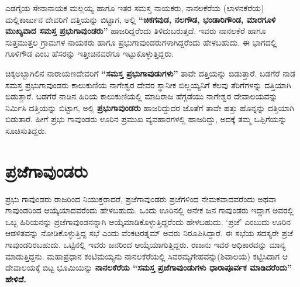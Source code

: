 ಎಡಗೈಯ ಸೇನಾನಾಯಕ ಮಲ್ಲಯ್ಯ ಹಾಗೂ ಇತರ ಸಮಸ್ತ ನಾಯಕರು, ನಾನಲಕೆರೆಯ (ಲಾಳನಕೆರೆಯ) ಮಲ್ಲಿಕಾರ್ಜುನ ದೇವರಿಗೆ ದತ್ತಿಯನ್ನು ಬಿಟ್ಟಾಗ, ಅಲ್ಲಿ \textbf{“ಚಿಕಗವುಡ, ನಲಗೌಡ, ಭಂಡಾರಿಗೌಂಡ, ಮಾರಗೂಳಿ ಮುಖ್ಯವಾದ ಸಮಸ್ತ ಪ್ರಭುಗಾವುಂಡರು”} ಹಾಜರಿದ್ದರೆಂದು ತಿಳಿದುಬರುತ್ತದೆ. ಇವರು ನಾನಲಕೆರೆ ಹಾಗೂ ಸುತ್ತಮುತ್ತಲ ಗ್ರಾಮಗಳ ನಾಯಕರು ಹಾಗೂ ಪ್ರಭುಗಾವುಂಡರುಗಳಾಗಿದ್ದರೆಂದು ಹೇಳಬಹುದು. ಈ ಭಾಗದಲ್ಲಿ ಗೂಳಿಗೌಡ ಎಂಬ ಹೆಸರನ್ನು ಇತ್ತೀಚಿನವರೆಗೂ ಇಟ್ಟುಕೊಳ್ಳುತ್ತಿದ್ದರು.

ಚಿಕ್ಕಅಬ್ಬಾಗಿಲಿನ ನಾರಾಯಣದೇವರಿಗೆ \textbf{“ಸಮಸ್ತ ಪ್ರಭುಗಾವುಡುಗಳು”} ತಾವೇ ದತ್ತಿಯನ್ನು ಬಿಡುತ್ತಾರೆ. ಬಡಗೆರೆ ನಾಡ ಸಮಸ್ತ ಪ್ರಭುಗಾವುಂಡರು ಕಾಲುಕುಣಿಯ ನಾಗೇಶ್ವರ ದೇವರ ಸ್ಥಾನೀಕ ಬಿಲ್ಲಯ್ಯನಿಗೆ ಕೆಲವು ತೆರಿಗೆಗಳನ್ನು ದತ್ತಿಯಾಗಿ ಬಿಡುತ್ತಾರೆ. ಬಡಗೆರೆ ನಾಡಿನ ಹಿರಿಯ ಕಾಲುಕುಣಿಯಲ್ಲಿ ಮಾದಿರಾಜ ಹೆಗ್ಗಡೆಯು ನಾಗೇಶ್ವರ ದೇವಾಲಯವನ್ನು ನಿರ್ಮಿಸಿ ದತ್ತಿಯನ್ನು ಬಿಟ್ಟಾಗ, ಅಲ್ಲಿ \textbf{ಪ್ರಭುಗಾವುಂಡರು} ಹಾಜರಿದ್ದುದರ ಜೊತೆಗೆ ತಾವೇ ಹತ್ತು ಹೊನ್ನನ್ನು ದತ್ತಿಯಾಗಿ ಬಿಡುತಾರೆ. ಹೀಗೆ ಪ್ರಭು ಗಾವುಂಡರು ಊರಿನ ಪ್ರಮುಖ ವ್ಯವಹಾರಗಳಲ್ಲಿ ಹಾಜರಿದ್ದು, ಅದಕ್ಕೆ ತಮ್ಮ ಒಪ್ಪಿಗೆಯನ್ನು ಸೂಚಿಸುತಿದ್ದರು.


\section*{ಪ್ರಜೆಗಾವುಂಡರು}

ಪ್ರಭು ಗಾವುಂಡರು ರಾಜರಿಂದ ನಿಯುಕ್ತರಾದರೆ, ಪ್ರಜೆಗಾವುಂಡರು ಪ್ರಜೆಗಳಿಂದ ನೇಮಕವಾದವರೆಂದು ಅಥವಾ ಗಾವುಂಡ\-ರಿಂದ ಆಯ್ಕೆಯಾದವರೆಂದು ಹೇಳಬಹುದು. ಒಂದು ಊರಿನಲ್ಲಿ ಅನೇಕ ಜನ ಗಾವುಂಡರು ಇದ್ದಾಗ ಅವರಲ್ಲಿ ಒಬ್ಬ ಹಿರಿಯನನ್ನು ಪ್ರಜೆಗಾವುಂಡನನ್ನಾಗಿ ಆಯ್ಕೆಮಾಡಿಕೊಳ್ಳುತ್ತಿದ್ದರೆಂದು ಹೇಳಬಹುದು. ‘ಪ್ರಜೆ’ ಎಂಬುದು ಊರಿನ ಆಡಳಿತವನ್ನು ನೋಡಿ\-ಕೊಳ್ಳುತ್ತಿದ್ದ ಸಭೆ ಎಂದು ವೆಂಕಟರತ್ನಮ್ ಅವರು ನಿರೂಪಿಸಿದ್ದಾರೆ. ಈ ಸಭೆಯ ಸದಸ್ಯರೇ ಪ್ರಜೆ ಗಾವುಂಡರಿರಬಹುದು. ಒಟ್ಟಿನಲ್ಲಿ ಇವರು ಜನರಿಂದ ಆಯ್ಕೆಯಾಗುತ್ತಿದ್ದರು. ರಾಜನು ಇವರ ಅಧಿಕಾರವನ್ನು ಮಾನ್ಯ ಮಾಡುತ್ತಿದ್ದನು. ಮಹಾಪ್ರಧಾನ ಕಂಟಿಮಯ್ಯನು ನಾನಲಕೆರೆಯಲ್ಲಿ ಸಿವರಮ್ಯಗೇಹವನ್ನು(ಶಿವಾಲಯ) ಕಟ್ಟಿಸಿದಾಗ ಆ ದೇವಾಲಯಕ್ಕೆ ಬಿಟ್ಟ ಭೂಮಿಯನ್ನು \textbf{ನಾನಲಕೆರೆಯ “ಸಮಸ್ತ ಪ್ರಜೆಗಾವುಂಡುಗಳು ಧಾರಾಪೂರ್ವಕ ಮಾಡಿದರೆಂದು” ಹೇಳಿದೆ.}


